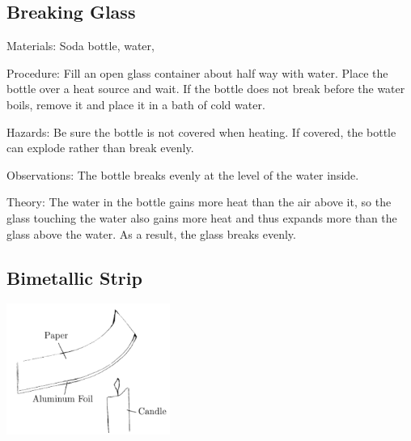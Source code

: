 \begin{multicols}{2}
\subsection{Breaking Glass}


\begin{description*}
\item[Materials:]{Soda bottle, water, }
\item[Procedure:]{Fill an open glass container about half way with water. Place the bottle over a heat source and wait. If the bottle does not break before the water boils, remove it and place it in a bath of cold water.}
\item[Hazards:]{Be sure the bottle is not covered when heating. If covered, the bottle can explode rather than break evenly.}
\item[Observations:]{The bottle breaks evenly at the level of the water inside.}
\item[Theory:]{The water in the bottle gains more heat than the air above it, so the glass touching the water also gains more heat and thus expands more than the glass above the water. As a result, the glass breaks evenly.}
\end{description*}

\subsection{Bimetallic Strip}

\begin{center}
\includegraphics[width=0.4\textwidth]{./img/bimetallic-strip.png}
\end{center}


\end{multicols}
